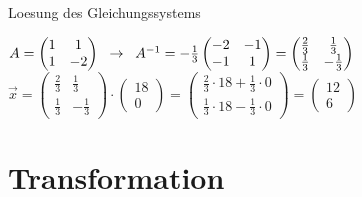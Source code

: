 \documentclass[10pt,aspectratio=169]{beamer}
\begin{document}
\begin{frame}{Loesung des Gleichungssystems}
\begin{itemize}
        $A= \begin{pmatrix}
          1 & 1\\
          1 & -2\\
        \end{pmatrix}\hspace{0.2cm} \rightarrow \hspace{0.2cm}
        A^{-1} = -\frac{1}{3}
        \begin{pmatrix}
          -2 & -1\\
          -1 & 1
        \end{pmatrix}
        = \begin{pmatrix}
          \frac{2}{3} & \frac{1}{3}\\
          \frac{1}{3} & -\frac{1}{3}
        \end{pmatrix}
        $\\\vspace{0.25cm}
        $
        \vec{x} = 
        \begin{pmatrix}
          \frac{2}{3} & \frac{1}{3}\\
          \frac{1}{3} & -\frac{1}{3}
        \end{pmatrix}
        \cdot
        \begin{pmatrix}
          18\\
          0
        \end{pmatrix}
        =
        \begin{pmatrix}
          \frac{2}{3}\cdot18 + \frac{1}{3} \cdot 0\\
          \frac{1}{3}\cdot18 - \frac{1}{3} \cdot 0
        \end{pmatrix}
        =
        \begin{pmatrix}
          12\\
          6
        \end{pmatrix}
        $
      
    \end{itemize}
  \end{frame}

  \section{Transformation}
\end{document}
